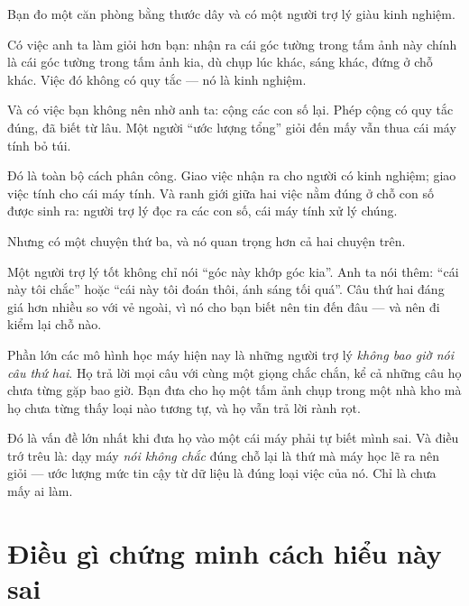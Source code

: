 \documentclass[../../vslam.tex]{subfiles}
\begin{document}
\begin{dongian}
Bạn đo một căn phòng bằng thước dây và có một người trợ lý giàu kinh nghiệm.

Có việc anh ta làm giỏi hơn bạn: nhận ra cái góc tường trong tấm ảnh này chính là cái góc tường trong tấm ảnh kia, dù chụp lúc khác, sáng khác, đứng ở chỗ khác. Việc đó không có quy tắc --- nó là kinh nghiệm.

Và có việc bạn không nên nhờ anh ta: cộng các con số lại. Phép cộng có quy tắc đúng, đã biết từ lâu. Một người ``ước lượng tổng'' giỏi đến mấy vẫn thua cái máy tính bỏ túi.

Đó là toàn bộ cách phân công. Giao việc nhận ra cho người có kinh nghiệm; giao việc tính cho cái máy tính. Và ranh giới giữa hai việc nằm đúng ở chỗ con số được sinh ra: người trợ lý đọc ra các con số, cái máy tính xử lý chúng.

Nhưng có một chuyện thứ ba, và nó quan trọng hơn cả hai chuyện trên.

Một người trợ lý tốt không chỉ nói ``góc này khớp góc kia''. Anh ta nói thêm: ``cái này tôi chắc'' hoặc ``cái này tôi đoán thôi, ánh sáng tối quá''. Câu thứ hai đáng giá hơn nhiều so với vẻ ngoài, vì nó cho bạn biết nên tin đến đâu --- và nên đi kiểm lại chỗ nào.

Phần lớn các mô hình học máy hiện nay là những người trợ lý \emph{không bao giờ nói câu thứ hai}. Họ trả lời mọi câu với cùng một giọng chắc chắn, kể cả những câu họ chưa từng gặp bao giờ. Bạn đưa cho họ một tấm ảnh chụp trong một nhà kho mà họ chưa từng thấy loại nào tương tự, và họ vẫn trả lời rành rọt.

Đó là vấn đề lớn nhất khi đưa họ vào một cái máy phải tự biết mình sai. Và điều trớ trêu là: dạy máy \emph{nói không chắc} đúng chỗ lại là thứ mà máy học lẽ ra nên giỏi --- ước lượng mức tin cậy từ dữ liệu là đúng loại việc của nó. Chỉ là chưa mấy ai làm.

\end{dongian}

\section{Điều gì chứng minh cách hiểu này sai}
\end{document}

